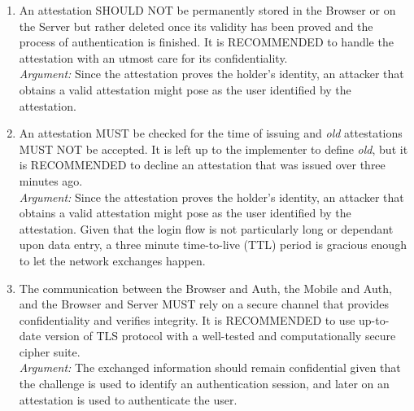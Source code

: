 \begin{enumerate}
            \item An attestation SHOULD NOT be permanently stored in the Browser or on the Server but rather deleted once
                  its validity has been proved and the process of authentication is finished. It is RECOMMENDED to handle 
                  the attestation with an utmost care for its confidentiality.\\
            \textit{Argument:} Since the attestation proves the holder's identity, an attacker that obtains a valid
                               attestation might pose as the user identified by the attestation.

            \item An attestation MUST be checked for the time of issuing and \textit{old} attestations MUST NOT be
                  accepted. It is left up to the implementer to define \textit{old}, but it is RECOMMENDED to
                  decline an attestation that was issued over three minutes ago.\\
            \textit{Argument:} Since the attestation proves the holder's identity, an attacker that obtains a valid
                               attestation might pose as the user identified by the attestation. Given that the login
                               flow is not particularly long or dependant upon data entry, a three minute time-to-live 
                               (TTL) period is gracious enough to let the network exchanges happen.

            \item The communication between the Browser and Auth, the Mobile and Auth, and the Browser and Server MUST 
                  rely on a secure channel that provides confidentiality and verifies integrity. It is RECOMMENDED to use
                  up-to-date version of TLS protocol with a well-tested and computationally secure cipher suite.\\      
            \textit{Argument:} The exchanged information should remain confidential given that the challenge is used to
                               identify an authentication session, and later on an attestation is used to authenticate the
                               user.
        \end{enumerate}

